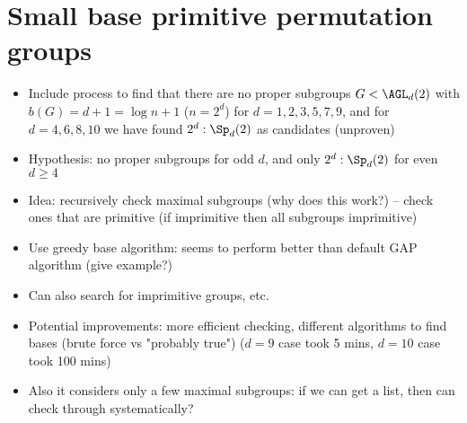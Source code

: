\section{Small base primitive permutation groups}

\begin{itemize}
    \item Include process to find that there are no proper subgroups $G < \AGL_d(2)$ with $b(G) = d + 1 = \log n + 1$ ($n = 2^d$) for $d = 1,2,3,5,7,9$, and for $d = 4,6,8,10$ we have found $2^d : \Sp_d(2)$ as candidates (unproven)
    \item Hypothesis: no proper subgroups for odd $d$, and only $2^d : \Sp_d(2)$ for even $d \geq 4$
    \item Idea: recursively check maximal subgroups (why does this work?) -- check ones that are primitive (if imprimitive then all subgroups imprimitive)
    \item Use greedy base algorithm: seems to perform better than default GAP algorithm (give example?)
    \item Can also search for imprimitive groups, etc.
    \item Potential improvements: more efficient checking, different algorithms to find bases (brute force vs "probably true") ($d = 9$ case took 5 mins, $d = 10$ case took 100 mins)
    \item Also it considers only a few maximal subgroups: if we can get a list, then can check through systematically?
\end{itemize}